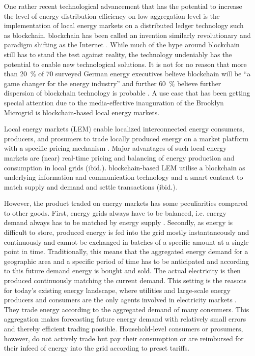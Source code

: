 One rather recent technological advancement that has the potential to increase the level of energy distribution efficiency on low aggregation level is the implementation of local energy markets on a distributed ledger technology such as blockchain. blockchain has been called an invention similarly revolutionary and paradigm shifting as the Internet \citep{Swan:2015}. While much of the hype around blockchain still has to stand the test against reality, the technology undeniably has the potential to enable new technological solutions. It is not for no reason that more than 20~\% of 70 surveyed German energy executives believe blockchain will be “a game changer for the energy industry” and further 60~\% believe further dispersion of blockchain technology is probable \citep{Burger:2016}. A use case that has been getting special attention due to the media-effective inauguration of the Brooklyn Microgrid \citep{newscientist:2016} is blockchain-based local energy markets.

Local energy markets (LEM) enable localized interconnected energy consumers, producers, and prosumers to trade locally produced energy on a market platform with a specific pricing mechanism \citep{Mengelkamp:2018a}. Major advantages of such local energy markets are (near) real-time pricing and balancing of energy production and consumption in local grids (ibid.). blockchain-based LEM utilise a blockchain as underlying information and communication technology and a smart contract to match supply and demand and settle transactions (ibid.).

However, the product traded on energy markets has some peculiarities compared to other goods. First, energy grids always have to be balanced, i.e. energy demand always has to be matched by energy supply \citep{Weron:2006}. Secondly, as energy is difficult to store, produced energy is fed into the grid mostly instantaneously and continuously and cannot be exchanged in batches of a specific amount at a single point in time. Traditionally, this means that the aggregated energy demand for a geographic area and a specific period of time has to be anticipated and according to this future demand energy is bought and sold. The actual electricity is then produced continuously matching the current demand. This setting is the reasons for today’s existing energy landscape, where utilities and large-scale energy producers and consumers are the only agents involved in electricity markets \citep{Weron:2006}. They trade energy according to the aggregated demand of many consumers. This aggregation makes forecasting future energy demand with relatively small errors \citep{Meer:2018, Wang:2018} and thereby efficient trading possible. Household-level consumers or prosumers, however, do not actively trade but pay their consumption or are reimbursed for their infeed of energy into the grid according to preset tariffs. 

